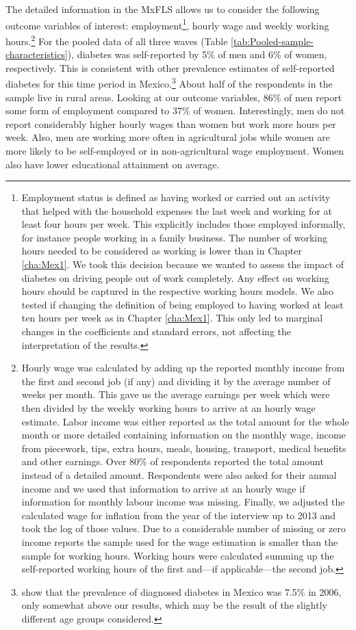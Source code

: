 The detailed information in the \ac{MxFLS} allows us to consider the following outcome variables of interest: employment\footnote{Employment status is defined as having worked or carried out an activity that helped with the household expenses the last week and working for at least four hours per week. This explicitly includes those employed informally, for instance people working in a family business. The number of working hours needed to be considered as working is lower than in Chapter \ref{cha:Mex1}. We took this decision because we wanted to assess the impact of diabetes on driving people out of work completely. Any effect on working hours should be captured in the respective working hours models. We also tested if changing the definition of being employed to having worked at least ten hours per week as in Chapter \ref{cha:Mex1}. This only led to marginal changes in the coefficients and standard errors, not affecting the interpretation of the results.}, hourly wage and weekly working hours.\footnote{Hourly wage was calculated by adding up the reported monthly income from the first and second job (if any) and dividing it by the average number of weeks per month. This gave us the average earnings per week which were then divided by the weekly working hours to arrive at an hourly wage estimate. Labor income was either reported as the total amount for the whole month or more detailed containing information on the monthly wage, income from piecework, tips, extra hours, meals, housing, transport, medical benefits and other earnings. Over 80\% of respondents reported the total amount instead of a detailed amount. Respondents were also asked for their annual income and we used that information to arrive at an hourly wage if information for monthly labour income was missing. Finally, we adjusted the calculated wage for inflation from the year of the interview up to 2013 and took the log of those values. Due to a considerable number of missing or zero income reports the sample used for the wage estimation is smaller than the sample for working hours. Working hours were calculated summing up the self-reported working hours of the first and---if applicable---the second job.} For the pooled data of all three waves (Table  \ref{tab:Pooled-sample-characteristics}), diabetes was self-reported by 5\% of men and 6\% of women, respectively. This is consistent with other prevalence estimates of self-reported diabetes for this time period in Mexico.\footnote{\textcite{Barquera2013} show that the prevalence of diagnosed diabetes in Mexico was 7.5\% in 2006, only somewhat above our results, which may be the result of the slightly different age groups considered.}  About half of the respondents in the sample live in rural areas. Looking at our outcome variables, 86\% of men report some form of employment compared to 37\% of women. Interestingly, men do not report considerably higher hourly wages than women but work more hours per week. Also, men are working more often in agricultural jobs while women are more likely to be self-employed or in non-agricultural wage employment. Women also have lower educational attainment on average. 



